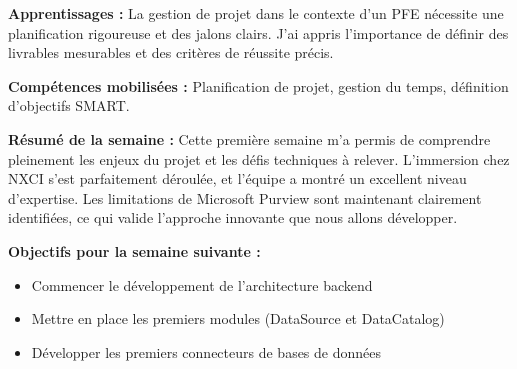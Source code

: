 \textbf{Apprentissages :}
La gestion de projet dans le contexte d'un PFE nécessite une planification rigoureuse et des jalons clairs. J'ai appris l'importance de définir des livrables mesurables et des critères de réussite précis.

\textbf{Compétences mobilisées :}
Planification de projet, gestion du temps, définition d'objectifs SMART.

\textbf{Résumé de la semaine :}
Cette première semaine m'a permis de comprendre pleinement les enjeux du projet et les défis techniques à relever. L'immersion chez NXCI s'est parfaitement déroulée, et l'équipe a montré un excellent niveau d'expertise. Les limitations de Microsoft Purview sont maintenant clairement identifiées, ce qui valide l'approche innovante que nous allons développer.

\textbf{Objectifs pour la semaine suivante :}
\begin{itemize}
    \item Commencer le développement de l'architecture backend
    \item Mettre en place les premiers modules (DataSource et DataCatalog)
    \item Développer les premiers connecteurs de bases de données
\end{itemize}